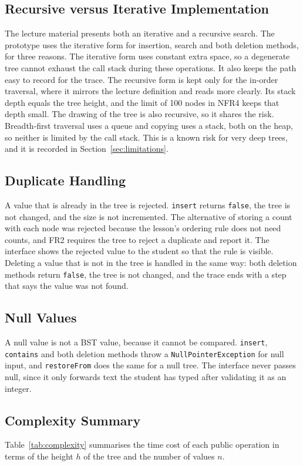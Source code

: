 \subsection{Recursive versus Iterative Implementation}
The lecture material presents both an iterative and a recursive search. The prototype uses the iterative form for insertion, search and both deletion methods, for three reasons. The iterative form uses constant extra space, so a degenerate tree cannot exhaust the call stack during these operations. It also keeps the path easy to record for the trace. The recursive form is kept only for the in-order traversal, where it mirrors the lecture definition and reads more clearly. Its stack depth equals the tree height, and the limit of 100 nodes in NFR4 keeps that depth small. The drawing of the tree is also recursive, so it shares the risk. Breadth-first traversal uses a queue and copying uses a stack, both on the heap, so neither is limited by the call stack. This is a known risk for very deep trees, and it is recorded in Section~\ref{sec:limitations}.

\subsection{Duplicate Handling}
A value that is already in the tree is rejected. \texttt{insert} returns \texttt{false}, the tree is not changed, and the size is not incremented. The alternative of storing a count with each node was rejected because the lesson's ordering rule does not need counts, and FR2 requires the tree to reject a duplicate and report it. The interface shows the rejected value to the student so that the rule is visible. Deleting a value that is not in the tree is handled in the same way: both deletion methods return \texttt{false}, the tree is not changed, and the trace ends with a step that says the value was not found.

\subsection{Null Values}
A null value is not a BST value, because it cannot be compared. \texttt{insert}, \texttt{contains} and both deletion methods throw a \texttt{NullPointerException} for null input, and \texttt{restoreFrom} does the same for a null tree. The interface never passes null, since it only forwards text the student has typed after validating it as an integer.

\subsection{Complexity Summary}
Table~\ref{tab:complexity} summarises the time cost of each public operation in terms of the height $h$ of the tree and the number of values $n$.


